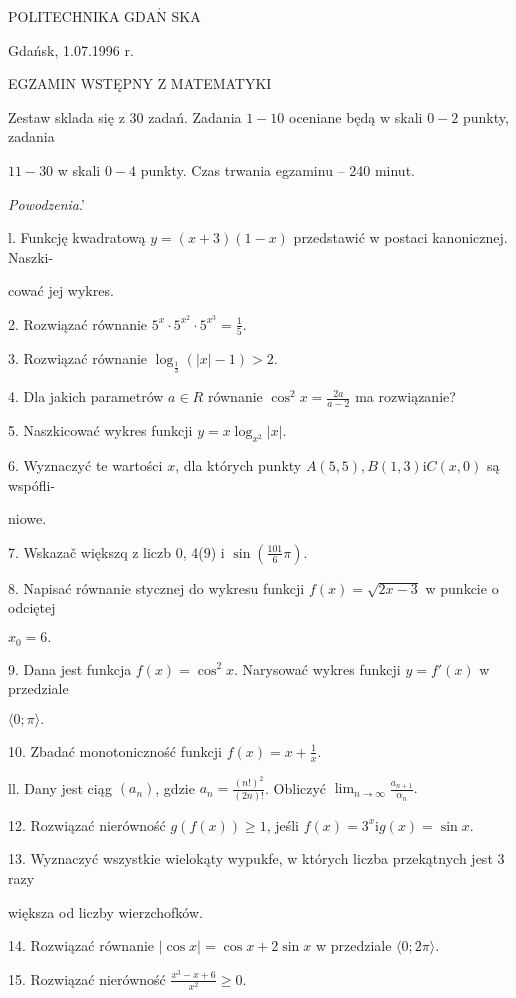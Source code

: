 \documentclass[a4paper,12pt]{article}
\begin{document}
POLITECHNIKA $\mathrm{G}\mathrm{D}\mathrm{A}\acute{\mathrm{N}}$ SKA

Gdańsk, 1.07.1996 r.

EGZAMIN WSTĘPNY Z MATEMATYKI

Zestaw sklada się z 30 zadań. Zadania $1-10$ oceniane będą w skali $0-2$ punkty, zadania

$11-30$ w skali $0-4$ punkty. Czas trwania egzaminu -- 240 minut.

{\it Powodzenia}.'

l. Funkcję kwadratową $y=(x+3)(1-x)$ przedstawić w postaci kanonicznej. Naszki-

cować jej wykres.

2. Rozwiązać równanie $5^{x}\displaystyle \cdot 5^{x^{2}}\cdot 5^{x^{3}}=\frac{1}{5}.$

3. Rozwiązać równanie $\log_{\frac{1}{3}}(|x|-1)>2.$

4. Dla jakich parametrów $a\in R$ równanie $\displaystyle \cos^{2}x=\frac{2a}{a-2}$ ma rozwiązanie?

5. Naszkicować wykres funkcji $y=x\log_{x^{2}}|x|.$

6. Wyznaczyć te wartości $x$, dla których punkty $A(5,5), B(1,3)\mathrm{i}C(x,0)$ są wspófli-

niowe.

7. Wskazač większq z liczb 0, 4(9) i $\displaystyle \sin(\frac{101}{6}\pi).$

8. Napisać równanie stycznej do wykresu funkcji $f(x)=\sqrt{2x-3}$ w punkcie o odciętej

$x_{0}=6.$

9. Dana jest funkcja $f(x)=\cos^{2}x$. Narysować wykres funkcji $y=f'(x)$ w przedziale

$\langle 0;\pi\rangle.$

10. Zbadać monotoniczność funkcji $f(x)=x+\displaystyle \frac{1}{x}.$

ll. Dany jest ciąg $(a_{n})$, gdzie $a_{n}=\displaystyle \frac{(n!)^{2}}{(2n)!}$. Obliczyć $\displaystyle \lim_{n\rightarrow\infty}\frac{a_{n+1}}{\alpha_{n}}.$

12. Rozwiązać nierówność $g(f(x))\geq 1$, jeśli $f(x)=3^{x}\mathrm{i}g(x)=\sin x.$

13. Wyznaczyć wszystkie wielokąty wypukfe, w których liczba przekątnych jest 3 razy

większa od liczby wierzchofków.

14. Rozwiązać równanie $|\cos x|=\cos x+2\sin x$ w przedziale $\langle 0;2\pi\rangle.$

15. Rozwiązać nierówność $\displaystyle \frac{x^{3}-x+6}{x^{2}}\geq 0.$
\end{document}
